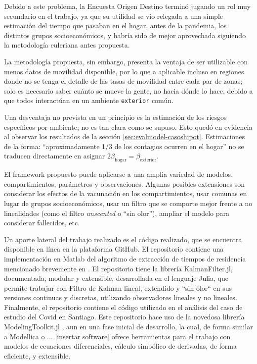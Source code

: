 Debido a este problema, la Encuesta Origen Destino terminó jugando un rol muy secundario en el trabajo, ya que su utilidad se vio relegada a una simple estimación del tiempo que pasaban en el hogar, antes de la pandemia, los distintos grupos socioeconómicos, y habría sido de mejor aprovechada siguiendo la metodología euleriana antes propuesta. 

La metodología propuesta, sin embargo, presenta la ventaja de ser utilizable con menos datos de movilidad disponible, por lo que a aplicable incluso en regiones donde no se tenga el detalle de las tasas de movilidad entre cada par de zonas; solo es necesario saber cuánto se mueve la gente, no hacia dónde lo hace, debido a que todos interactúan en un ambiente \texttt{exterior} común.

Una desventaja no prevista en un principio es la estimación de los riesgos específicos por ambiente; no es tan clara como se supuso. Esto quedó en evidencia al observar los resultados de la sección \ref{sec:evalmodel-casoshipot}. Estimaciones de la forma: ``aproximadamente 1/3 de los contagios ocurren en el hogar'' \cite{Ferguson2020} no se traducen directamente en asignar \( 2 \beta_{\text{hogar}} = \beta_{\text{exterior}}\).


El framework propuesto puede aplicarse a una amplia variedad de modelos, compartimientos, parámetros y observaciones. Algunas posibles extensiones son considerar los efectos de la vacunación en los compartimientos, usar comunas en lugar de grupos socioeconómicos, usar un filtro que se comporte mejor frente a no linealidades (como el filtro \textit{unscented} o ``sin olor''), ampliar el modelo para considerar fallecidos, etc.

Un aporte lateral del trabajo realizado es el código realizado, que se encuentra disponible en línea en la plataforma GitHub. El repositorio \url{} contiene una implementación en Matlab del algoritmo de extracción de tiempos de residencia mencionado brevemente en \cite{Munizaga2011}. El repositorio \url{} tiene la librería KalmanFilter.jl, documentada, modular y extensible, desarrollada en el lenguaje Julia, que permite trabajar con Filtro de Kalman lineal, extendido y ``sin olor`` en sus versiones continuas y discretas, utilizando observadores lineales y no lineales. Finalmente, el repositorio \url{} contiene el código utilizado en el análisis del caso de estudio del Covid en Santiago. Este repositorio hace uso de la novedosa librería ModelingToolkit.jl \cite{}, aun en una fase inicial de desarrollo, la cual, de forma similar a Modellica o ... [insertar software] ofrece herramientas para el trabajo con modelos de ecuaciones diferenciales, cálculo simbólico de derivadas, de forma eficiente, y extensible.

